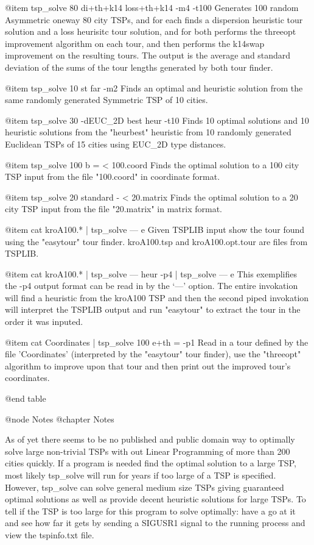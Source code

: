 @item tsp_solve 80 di+th+k14 loss+th+k14 -m4 -t100
Generates 100 random Asymmetric oneway 80 city TSPs, and for each finds a
dispersion heuristic tour solution and a loss heurisitc tour solution, and
for both performs the threeopt improvement algorithm on each tour, and then
performs the k14swap improvement on the resulting tours.  The output is
the average and standard deviation of the sums of the tour lengths generated
by both tour finder.

@item tsp_solve 10 st far -m2
Finds an optimal and heuristic solution from the same randomly generated
Symmetric TSP of 10 cities.

@item tsp_solve 30 -dEUC_2D best heur -t10
Finds 10 optimal solutions and 10 heuristic solutions from the "heurbest"
heuristic from 10 randomly generated Euclidean TSPs of 15 cities using EUC_2D
type distances.

@item tsp_solve 100 b = < 100.coord
Finds the optimal solution to a 100 city TSP input from the file "100.coord" in
coordinate format.

@item tsp_solve 20 standard - < 20.matrix
Finds the optimal solution to a 20 city TSP input from the file "20.matrix" in
matrix format.

@item cat kroA100.* | tsp_solve --- e
Given TSPLIB input show the tour found using the "easytour" tour finder.
kroA100.tsp and kroA100.opt.tour are files from TSPLIB.

@item cat kroA100.* | tsp_solve --- heur -p4 | tsp_solve --- e
This exemplifies the -p4 output format can be read in by the `---' option.
The entire invokation will find a heuristic from the kroA100 TSP and then the
second piped invokation will interpret the TSPLIB output and run "easytour"
to extract the tour in the order it was inputed.

@item cat Coordinates | tsp_solve 100 e+th = -p1
Read in a tour defined by the file 'Coordinates' (interpreted by the "easytour"
tour finder), use the "threeopt" algorithm to improve upon that tour and then
print out the improved tour's coordinates.

@end table

@node Notes
@chapter Notes

As of yet there seems to be no published and public domain way to optimally
solve large non-trivial TSPs with out Linear Programming of more than
200 cities quickly.  If a program is needed find the optimal solution to
a large TSP, most likely tsp_solve will run for years if too large of a
TSP is specified.  However, tsp_solve can solve general medium size TSPs
giving guaranteed optimal solutions as well as provide decent heuristic
solutions for large TSPs.  To tell if the TSP is too large for this program
to solve optimally: have a go at it and see how far it gets by sending
a SIGUSR1 signal to the running process and view the tspinfo.txt file.

